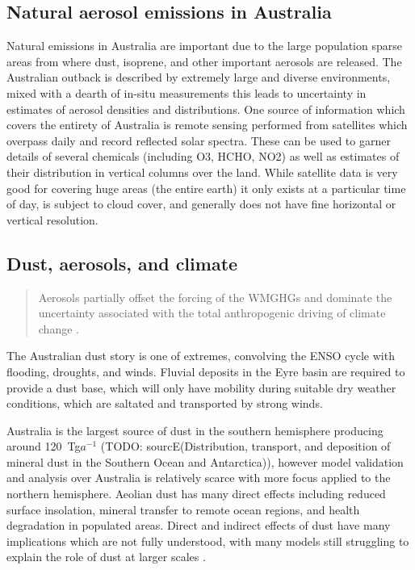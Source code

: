 \subsection{Natural aerosol emissions in Australia}
Natural emissions in Australia are important due to the large population sparse areas from where dust, isoprene, and other important aerosols are released.
The Australian outback is described by extremely large and diverse environments, mixed with a dearth of in-situ measurements this leads to uncertainty in estimates of aerosol densities and distributions.
One source of information which covers the entirety of Australia is remote sensing performed from satellites which overpass daily and record reflected solar spectra.
These can be used to garner details of several chemicals (including O3, HCHO, NO2) as well as estimates of their distribution in vertical columns over the land.
While satellite data is very good for covering huge areas (the entire earth) it only exists at a particular time of day, is subject to cloud cover, and generally does not have fine horizontal or vertical resolution.



\subsection{Dust, aerosols, and climate}
\begin{quote}
Aerosols partially offset the forcing of the WMGHGs and dominate the uncertainty associated with the total anthropogenic driving of climate change \cite{IPCC_2013_chap8}.
\end{quote}

The Australian dust story is one of extremes, convolving the ENSO cycle with flooding, droughts, and winds.
Fluvial deposits in the Eyre basin are required to provide a dust base, which will only have mobility during suitable dry weather conditions, which are saltated and transported by strong winds\cite{Zender_2003}.

Australia is the largest source of dust in the southern hemisphere producing around 120~Tg$a^{-1}$ (TODO: sourcE(Distribution, transport, and deposition of mineral dust in the Southern Ocean and Antarctica)), however model validation and analysis over Australia is relatively scarce with more focus applied to the northern hemisphere.
Aeolian dust has many direct effects including reduced surface insolation, mineral transfer to remote ocean regions, and health degradation in populated areas.
Direct and indirect effects of dust have many implications which are not fully understood, with many models still struggling to explain the role of dust at larger scales \cite{Rotstayn_2011}.

